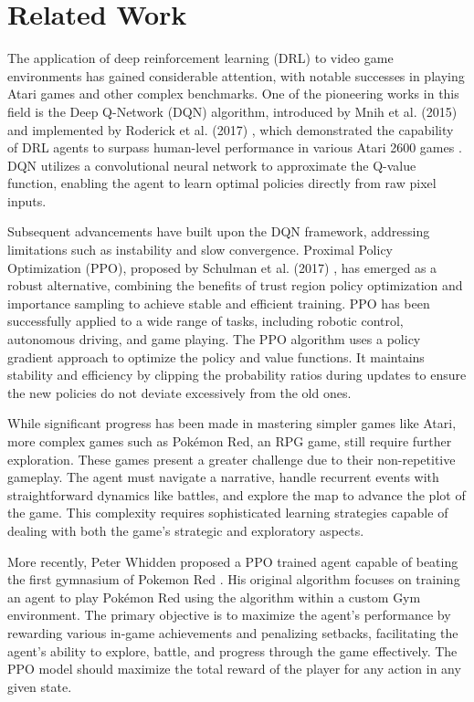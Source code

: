 \documentclass[10pt,conference]{IEEEtran}
\begin{document}
\section{Related Work}
The application of deep reinforcement learning (DRL) to video game environments has gained considerable attention, with notable successes in playing Atari games and other complex benchmarks. One of the pioneering works in this field is the Deep Q-Network (DQN) algorithm, introduced by Mnih et al. (2015) \cite{ref:dqn} and implemented by Roderick et al. (2017) \cite{ref:dqn2}, which demonstrated the capability of DRL agents to surpass human-level performance in various Atari 2600 games \cite{ref:ale}. DQN utilizes a convolutional neural network to approximate the Q-value function, enabling the agent to learn optimal policies directly from raw pixel inputs.

Subsequent advancements have built upon the DQN framework, addressing limitations such as instability and slow convergence. Proximal Policy Optimization (PPO), proposed by Schulman et al. (2017) \cite{ref:ppo}, has emerged as a robust alternative, combining the benefits of trust region policy optimization and importance sampling to achieve stable and efficient training. PPO has been successfully applied to a wide range of tasks, including robotic control, autonomous driving, and game playing. The PPO algorithm uses a policy gradient approach to optimize the policy and value functions. It maintains stability and efficiency by clipping the probability ratios during updates to ensure the new policies do not deviate excessively from the old ones. 

While significant progress has been made in mastering simpler games like Atari, more complex games such as Pokémon Red, an RPG game, still require further exploration. These games present a greater challenge due to their non-repetitive gameplay. The agent must navigate a narrative, handle recurrent events with straightforward dynamics like battles, and explore the map to advance the plot of the game. This complexity requires sophisticated learning strategies capable of dealing with both the game's strategic and exploratory aspects.

More recently, Peter Whidden proposed a PPO trained agent capable of beating the first gymnasium of Pokemon Red \cite{ref:whidden}. His original algorithm focuses on training an agent to play Pokémon Red using the algorithm within a custom Gym \cite{ref:gymnasium} environment. The primary objective is to maximize the agent's performance by rewarding various in-game achievements and penalizing setbacks, facilitating the agent's ability to explore, battle, and progress through the game effectively. The PPO model should maximize the total reward of the player for any action in any given state.
\end{document}

